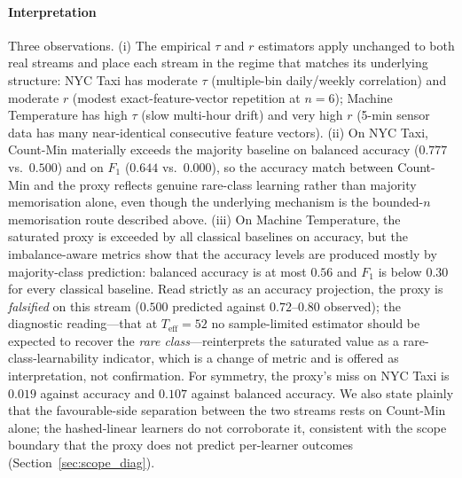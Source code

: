 \documentclass[sensors,article,submit,pdftex,moreauthors]{Definitions/mdpi}
\newcommand{\Teff}{T_{\mathrm{eff}}}
\begin{document}
\paragraph{Interpretation} Three observations.
(i) The empirical $\tau$ and $r$ estimators apply unchanged to both real streams and place each stream in the regime that matches its underlying structure: NYC Taxi has moderate $\tau$ (multiple-bin daily/weekly correlation) and moderate $r$ (modest exact-feature-vector repetition at $n = 6$); Machine Temperature has high $\tau$ (slow multi-hour drift) and very high $r$ (5-min sensor data has many near-identical consecutive feature vectors).
(ii) On NYC Taxi, Count-Min materially exceeds the majority baseline on balanced accuracy ($0.777$ vs.\ $0.500$) and on $F_1$ ($0.644$ vs.\ $0.000$), so the accuracy match between Count-Min and the proxy reflects genuine rare-class learning rather than majority memorisation alone, even though the underlying mechanism is the bounded-$n$ memorisation route described above.
(iii) On Machine Temperature, the saturated proxy is exceeded by all classical baselines on accuracy, but the imbalance-aware metrics show that the accuracy levels are produced mostly by majority-class prediction: balanced accuracy is at most $0.56$ and $F_1$ is below $0.30$ for every classical baseline. Read strictly as an accuracy projection, the proxy is \emph{falsified} on this stream ($0.500$ predicted against $0.72$--$0.80$ observed); the diagnostic reading---that at $\Teff = 52$ no sample-limited estimator should be expected to recover the \emph{rare class}---reinterprets the saturated value as a rare-class-learnability indicator, which is a change of metric and is offered as interpretation, not confirmation. For symmetry, the proxy's miss on NYC Taxi is $0.019$ against accuracy and $0.107$ against balanced accuracy. We also state plainly that the favourable-side separation between the two streams rests on Count-Min alone; the hashed-linear learners do not corroborate it, consistent with the scope boundary that the proxy does not predict per-learner outcomes (Section~\ref{sec:scope_diag}).
\end{document}

